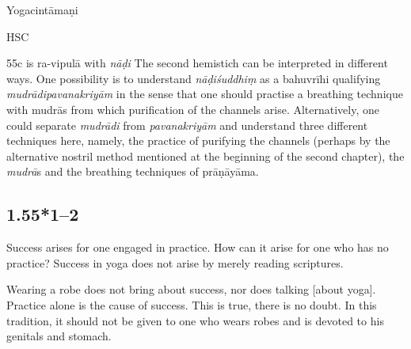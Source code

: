 \begin{ekdosis}
\begin{sources}[hp01_055]
\end{sources}

\begin{testimonia}[hp01_055]
Yogacintāmaṇi

\begin{versinnote}
\end{versinnote}

HSC

\begin{versinnote}
\end{versinnote}

\end{testimonia}

\begin{philcomm}[hp01_055]
55c is ra-vipulā with \emph{nāḍi}
The second hemistich can be interpreted in different ways. One possibility is to understand \emph{nāḍiśuddhiṃ} as a bahuvrīhi qualifying \emph{mudrādipavanakriyām} in the sense that one should practise a breathing technique with mudrās from which purification of the channels arise. Alternatively, one could separate \emph{mudrādi} from \emph{pavanakriyām} and understand three different techniques here, namely, the practice of purifying the channels (perhaps by the alternative nostril method mentioned at the beginning of the second chapter), the \emph{mudrā}s and the breathing techniques of prāṇāyāma.  
\end{philcomm}

\subsection*{1.55*1--2}
\begin{translation}[hp01_055_1]
Success arises for one engaged in practice. How can it arise for one who has no practice? Success in yoga does not arise by merely reading scriptures.
\end{translation}

\begin{translation}[hp01_055_2]
Wearing a robe does not bring about success, nor does talking [about yoga]. Practice alone is the cause of success. This is true, there is no doubt. In this tradition, it should not be given to one who wears robes and is devoted to his genitals and stomach.
\end{translation}


\end{ekdosis}
